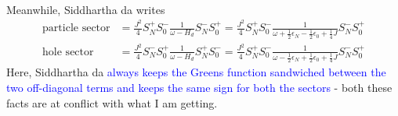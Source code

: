 \documentclass[14pt]{extarticle}
\begin{document}
\begin{itemize}
\begin{equation}
\begin{aligned}
	\end{aligned}\end{equation}
Meanwhile, Siddhartha da writes
		\begin{equation}\begin{aligned}
			\label{sid}
			\text{particle sector} &= \frac{J^2}{4}S_N^+ S_0^- \frac{1}{\omega - H_d}S_N^- S_0^+ = \frac{J^2}{4}S_N^+ S_0^- \frac{1}{\omega + \frac{1}{2}\epsilon_N - \frac{1}{2}\epsilon_0 + \frac{1}{4}J}S_N^- S_0^+\\
			\text{hole sector} &= \frac{J^2}{4}S_N^- S_0^+  \frac{1}{\omega - H_d}S_N^+ S_0^- = \frac{J^2}{4}S_N^+ S_0^- \frac{1}{\omega - \frac{1}{2}\epsilon_N + \frac{1}{2}\epsilon_0 + \frac{1}{4}J}S_N^- S_0^+
		\end{aligned}\end{equation}
		Here, Siddhartha da \textcolor{blue}{always keeps the Greens function sandwiched between the two off-diagonal terms and keeps the same sign for both the sectors} - both these facts are at conflict with what I am getting.
\end{itemize}
\end{document}
